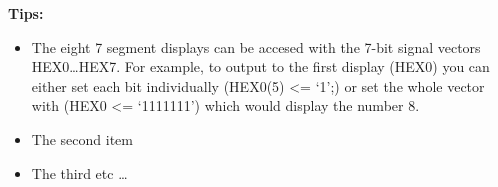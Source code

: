 {\bf Tips:} 
\begin{itemize}
  \item The eight 7 segment displays can be accesed with the 7-bit signal vectors HEX0\ldots HEX7. For example, to output to the first display (HEX0) you can either set each bit individually (HEX0(5) <= `1';) or set the whole vector with (HEX0 <= `1111111') which would display the number 8. 
  \item The second item
  \item The third etc \ldots
\end{itemize}